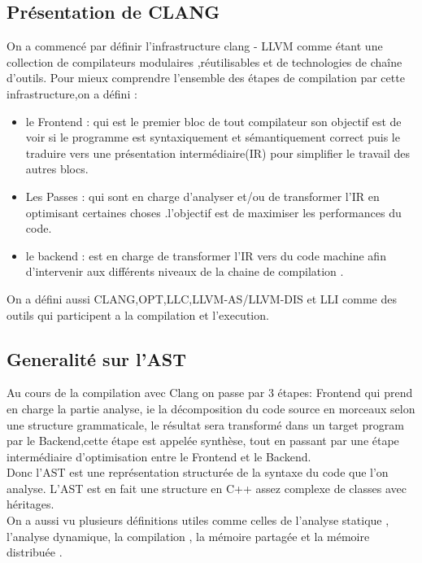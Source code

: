 \documentclass[12pt,a4paper]{article}
\begin{document}
\subsection{Présentation de CLANG \cite{clangllvm}  }

On a commencé par définir l'infrastructure clang - LLVM  comme étant une collection de compilateurs modulaires ,réutilisables et de technologies de chaîne d’outils. Pour mieux comprendre l’ensemble des étapes de compilation par cette infrastructure,on a défini :
    \begin{itemize}

    \item le Frontend : qui est le premier bloc de tout compilateur son objectif est de voir si le programme est syntaxiquement et sémantiquement correct puis le traduire vers une présentation intermédiaire(IR) pour simplifier le travail des autres blocs.
    \item Les Passes : qui sont en charge d'analyser et/ou de transformer l'IR en optimisant certaines choses .l'objectif est de maximiser les performances du code.
    \item le backend : est en charge de transformer l'IR vers du code machine afin d'intervenir aux différents niveaux de la chaine de compilation .
     \end{itemize}
 On a défini aussi CLANG,OPT,LLC,LLVM-AS/LLVM-DIS et LLI comme des outils qui participent a la compilation et l'execution.



\subsection{Generalité sur l'AST}

Au cours de la compilation avec Clang on passe par 3 étapes: Frontend qui prend en charge la partie analyse, ie la décomposition du code source en morceaux selon une structure grammaticale, le résultat sera transformé  dans un target program par le Backend,cette étape est appelée synthèse, tout en passant par une étape intermédiaire d'optimisation entre le Frontend et le Backend.\cite{Devlieghere}\\ Donc l’AST est une représentation structurée de la syntaxe du code que l’on analyse. L’AST est en fait une structure en C++ assez complexe de classes avec héritages.\\


 On a aussi vu plusieurs définitions utiles comme celles de l'analyse statique , l'analyse dynamique, la compilation , la mémoire partagée et la mémoire distribuée .
\end{document}
